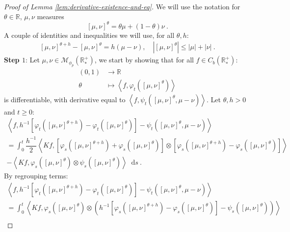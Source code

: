 \documentclass[11pt,a4paper]{article}
\newcommand{\RR}{\mathbb{R}}
\newcommand{\RRP}{\mathbb{R}^+_*}
\newcommand{\MC}{\mathcal{M}}
\newcommand{\brac}[1]{\left\langle#1\right\rangle}
\newcommand{\dd}{\mathop{}\!\mathrm{d}}
\begin{document}
\begin{proof}[Proof of Lemma \ref{lem:derivative-existence-and-eq}]
    We will use the notation for $\theta \in \RR$, $\mu,\nu $ measures 
    \[
    \left[\mu,\nu \right]^\theta = \theta\mu + (1-\theta)\nu\ .
    \]
    A couple of identities and inequalities we will use, for all $\theta, h$:
    \begin{align*}
        \left[\mu,\nu \right]^{\theta+h} - \left[\mu,\nu \right]^{\theta} = h(\mu - \nu),\quad \left|\left[\mu,\nu \right]^{\theta}\right| \leq |\mu| + |\nu|\ .
    \end{align*}
    \textbf{Step $1$}: Let $\mu,\nu \in \MC_{\phi_{p}}(\RRP)$, we start by showing that for all $f \in C_b(\RRP)$:
    \begin{align*}
        (0,1) &\to \RR \\
        \theta &\mapsto \brac{f,\varphi_t\left(\left[\mu,\nu \right]^\theta\right)}
    \end{align*}
    is differentiable, with derivative equal to $\brac{f,\psi_t\left(\left[\mu,\nu \right]^\theta,\mu-\nu\right)}$. Let $\theta,h > 0$ and $t \geq 0$:
    \begin{multline*}
        \brac{f,h^{-1}\left[\varphi_t\left(\left[\mu,\nu \right]^{\theta+h} \right) - \varphi_t\left(\left[\mu,\nu \right]^{\theta} \right) \right] - \psi_t\left(\left[\mu,\nu \right]^\theta,\mu-\nu\right)} \\
        = \int_0^t \dfrac{h^{-1}}{2}\brac{Kf,\left[\varphi_s\left(\left[\mu,\nu \right]^{\theta+h} \right) + \varphi_s\left(\left[\mu,\nu \right]^{\theta} \right)\right]\otimes \left[\varphi_s\left(\left[\mu,\nu \right]^{\theta+h} \right) - \varphi_s\left(\left[\mu,\nu \right]^{\theta} \right)\right]} \\
        - \brac{Kf,\varphi_s\left(\left[\mu,\nu \right]^{\theta}\right)\otimes \psi_s\left(\left[\mu,\nu \right]^{\theta}\right) }\dd s\ .
    \end{multline*}
    By regrouping terms:
    \begin{multline*}
        \brac{f,h^{-1}\left[\varphi_t\left(\left[\mu,\nu \right]^{\theta+h} \right) - \varphi_t\left(\left[\mu,\nu \right]^{\theta} \right) \right] - \psi_t\left(\left[\mu,\nu \right]^\theta,\mu-\nu\right)} \\
        = \int_0^t \brac{Kf,\varphi_s\left(\left[\mu,\nu \right]^{\theta} \right)\otimes \left(h^{-1}\left[\varphi_s\left(\left[\mu,\nu \right]^{\theta+h} \right) - \varphi_s\left(\left[\mu,\nu \right]^{\theta} \right)\right] - \psi_s\left(\left[\mu,\nu \right]^{\theta}\right)\right)} \\

\end{multline*}
\end{proof}
\end{document}
